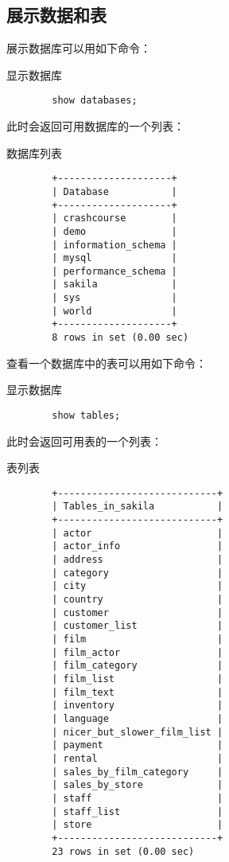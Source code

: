 \documentclass[UTF8]{article}
\begin{document}
\subsection{展示数据和表}

展示数据库可以用如下命令：

\begin{listing}[H]
	\caption{显示数据库}
	\label{code:showdatabase}
	\begin{verbatim}
        show databases;
\end{verbatim}
\end{listing}


此时会返回可用数据库的一个列表：

\begin{listing}[H]
	\caption{数据库列表}
	\label{code:databaselist}
	\begin{verbatim}
        +--------------------+
        | Database           |
        +--------------------+
        | crashcourse        |
        | demo               |
        | information_schema |
        | mysql              |
        | performance_schema |
        | sakila             |
        | sys                |
        | world              |
        +--------------------+
        8 rows in set (0.00 sec)
\end{verbatim}
\end{listing}

查看一个数据库中的表可以用如下命令：

\begin{listing}[H]
	\caption{显示数据库}
	\label{code:showtable}
	\begin{verbatim}
        show tables;
\end{verbatim}
\end{listing}

此时会返回可用表的一个列表：

\begin{listing}[H]
	\caption{表列表}
	\label{code:tablelist}
	\begin{verbatim}
        +----------------------------+
        | Tables_in_sakila           |
        +----------------------------+
        | actor                      |
        | actor_info                 |
        | address                    |
        | category                   |
        | city                       |
        | country                    |
        | customer                   |
        | customer_list              |
        | film                       |
        | film_actor                 |
        | film_category              |
        | film_list                  |
        | film_text                  |
        | inventory                  |
        | language                   |
        | nicer_but_slower_film_list |
        | payment                    |
        | rental                     |
        | sales_by_film_category     |
        | sales_by_store             |
        | staff                      |
        | staff_list                 |
        | store                      |
        +----------------------------+
        23 rows in set (0.00 sec)
\end{verbatim}
\end{listing}
\end{document}
